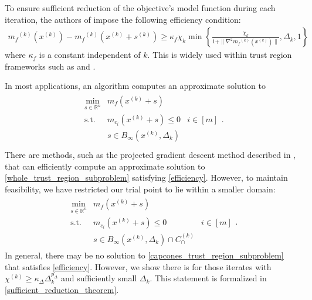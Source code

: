 \documentclass{article}
\theoremstyle{case}
\numberwithin{theorem}{subsection}
\newcommand{\capcones}{{C^{(k)}_{\cap}}}
\newcommand{\chik}{{\chi^{(k)}}}
\newcommand{\dk}{\Delta_k}
\newcommand{\mfk}{{{m}_f}^{(k)}}
\newcommand{\Rn}{\mathbb R^n}
\newcommand{\sk}{{{s}^{(k)}}}
\newcommand{\tr}{{ B_{\infty}\left(\xk, \dk\right) }}
\newcommand{\xk}{x^{(k)}}
\begin{document}
To ensure sufficient reduction of the objective's model function during each iteration, the authors of \cite{Conejo:2013:GCT:2620806.2621814} impose the following efficiency condition:
\begin{align}
\label{efficiency}
\mfk\left(\xk\right) - \mfk\left(\xk + \sk\right) \ge \kappa_f \chi_k \min\left\{ \frac{\chi_k}{1+\|\nabla^2 \mfk(\xk)\|}, \dk, 1 \right\}
\end{align}
where $\kappa_f$ is a constant independent of $k$.
This is widely used within trust region frameworks such as \cite{Conejo:2013:GCT:2620806.2621814} and \cite{Conn:2000:TM:357813}.

In most applications, an algorithm computes an approximate solution to
\begin{align}
\label{whole_trust_region_subproblem}
\begin{array}{ccc}
\min_{s \in \Rn} & m_{f}(\xk + s) & \\
\textrm{s.t.} & m_{c_i}(\xk + s) \le 0 & i \in [m]\\
& s \in \tr & \\
\end{array}.
\end{align}
There are methods, such as the projected gradient descent method described in \cite{Conn:2000:TM:357813},
that can efficiently compute an approximate solution to \cref{whole_trust_region_subproblem} satisfying \cref{efficiency}.
However, to maintain feasibility, we have restricted our trial point to lie within a smaller domain:
\begin{align}
\label{capcones_trust_region_subproblem}
\begin{array}{ccc}
\min_{s \in \Rn} & m_{f}(\xk + s) & \\
\textrm{s.t.} & m_{c_i}(\xk + s) \le 0 & i \in [m]\\
& s \in \tr \cap \capcones &
\end{array}.
\end{align}
In general, there may be no solution to \cref{capcones_trust_region_subproblem} that satisfies \cref{efficiency}.
However, we show there is for those iterates with $\chik \ge \kappa_{\Delta}\dk^{p_{\Delta}}$ and sufficiently small $\dk$.
This statement is formalized in \cref{sufficient_reduction_theorem}.


\end{document}
